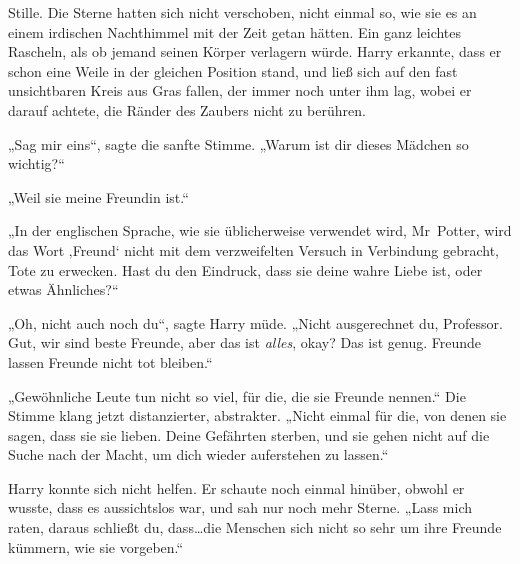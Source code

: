 Stille. Die Sterne hatten sich nicht verschoben, nicht einmal so, wie sie es an einem irdischen Nachthimmel mit der Zeit getan hätten. Ein ganz leichtes Rascheln, als ob jemand seinen Körper verlagern würde. Harry erkannte, dass er schon eine Weile in der gleichen Position stand, und ließ sich auf den fast unsichtbaren Kreis aus Gras fallen, der immer noch unter ihm lag, wobei er darauf achtete, die Ränder des Zaubers nicht zu berühren.

„Sag mir eins“, sagte die sanfte Stimme. „Warum ist dir dieses Mädchen so wichtig?“

„Weil sie meine Freundin ist.“

„In der englischen Sprache, wie sie üblicherweise verwendet wird, Mr~Potter, wird das Wort ‚Freund‘ nicht mit dem verzweifelten Versuch in Verbindung gebracht, Tote zu erwecken. Hast du den Eindruck, dass sie deine wahre Liebe ist, oder etwas Ähnliches?“

„Oh, nicht auch noch du“, sagte Harry müde. „Nicht ausgerechnet du, Professor. Gut, wir sind beste Freunde, aber das ist \emph{alles}, okay? Das ist genug. Freunde lassen Freunde nicht tot bleiben.“

„Gewöhnliche Leute tun nicht so viel, für die, die sie Freunde nennen.“ Die Stimme klang jetzt distanzierter, abstrakter. „Nicht einmal für die, von denen sie sagen, dass sie sie lieben. Deine Gefährten sterben, und sie gehen nicht auf die Suche nach der Macht, um dich wieder auferstehen zu lassen.“

Harry konnte sich nicht helfen. Er schaute noch einmal hinüber, obwohl er wusste, dass es aussichtslos war, und sah nur noch mehr Sterne.
„Lass mich raten, daraus schließt du, dass…die Menschen sich nicht so sehr um ihre Freunde kümmern, wie sie vorgeben.“

